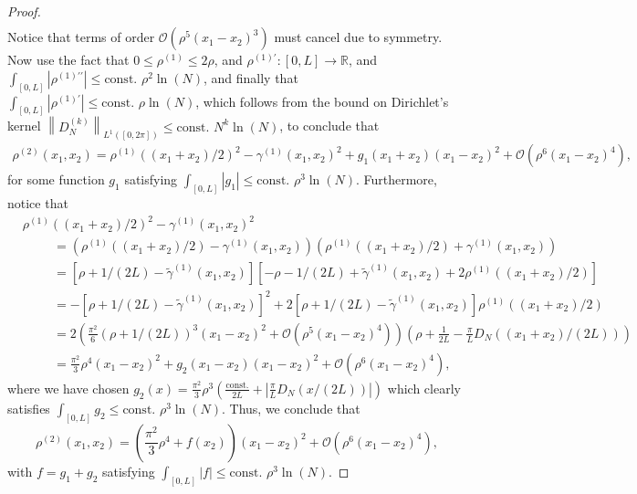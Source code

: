 \documentclass[a4paper,11pt]{article}
\newcommand{\norm}[1]{\left\lVert #1 \right\rVert}
\newcommand{\abs}[1]{\left\lvert #1 \right\rvert}
\newcommand{\R}{\mathbb{R}}
\numberwithin{equation}{section}
\begin{document}
\begin{proof}
\begin{equation}
\begin{aligned}
		\end{aligned}
		\end{equation}
		Notice that terms of order $ \mathcal{O}(\rho^5(x_1-x_2)^3) $ must cancel due to symmetry.\\
		Now use the fact that $ 0\leq\rho^{(1)}\leq 2\rho $, and $ \rho^{(1)\prime}:[0,L]\to \R $, and $\int_{[0,L]}\abs{\rho^{(1)\prime\prime}}\leq \text{const. }\rho^2\ln(N) $, and finally that  $\int_{[0,L]}\abs{\rho^{(1)\prime}}\leq \text{const. }\rho\ln(N) $, which follows from the bound on Dirichlet's kernel $ \norm{D_N^{(k)}}_{L^1([0,2\pi])}\leq \text{const. }N^{k}\ln(N) $, to conclude that
		\begin{equation}
		\begin{aligned}
		\rho^{(2)}(x_1,x_2)=\rho^{(1)}((x_1+x_2)/2)^2-\gamma^{(1)}(x_1,x_2)^2+g_1(x_1+x_2)(x_1-x_2)^2+\mathcal{O}(\rho^6(x_1-x_2)^4),
		\end{aligned}
		\end{equation}
		for some function $ g_1 $ satisfying $ \int_{[0,L]}\abs{g_1}\leq \text{const. }\rho^3\ln(N)$.
		Furthermore, notice that 
		\begin{equation}
		\begin{aligned}
		&\rho^{(1)}((x_1+x_2)/2)^2-\gamma^{(1)}(x_1,x_2)^2\\
		&\hspace{1cm}=(\rho^{(1)}((x_1+x_2)/2)-\gamma^{(1)}(x_1,x_2))(\rho^{(1)}((x_1+x_2)/2)+\gamma^{(1)}(x_1,x_2))\\&\hspace{1cm}
		=\left[\rho+1/(2L)-\tilde{\gamma}^{(1)}(x_1,x_2)\right]\left[-\rho-1/(2L)+\tilde{\gamma}^{(1)}(x_1,x_2)+2\rho^{(1)}((x_1+x_2)/2)\right]\\&\hspace{1cm}
		=-\left[\rho+1/(2L)-\tilde{\gamma}^{(1)}(x_1,x_2)\right]^2+2\left[\rho+1/(2L)-\tilde{\gamma}^{(1)}(x_1,x_2)\right]\rho^{(1)}((x_1+x_2)/2)\\&\hspace{1cm}
		= 2\left(\frac{\pi^2}{6}(\rho+1/(2L))^3(x_1-x_2)^2+\mathcal{O}(\rho^5(x_1-x_2)^4)\right)\left(\rho+\frac{1}{2L}-\frac{\pi}{L}D_{N}((x_1+x_2)/(2L))\right)\\&\hspace{1cm}
		=\frac{\pi^2}{3}\rho^4(x_1-x_2)^2+g_2(x_1-x_2)(x_1-x_2)^2+\mathcal{O}(\rho^6(x_1-x_2)^4),
		\end{aligned}
		\end{equation}
		where we have chosen $ g_2(x)=\frac{\pi^2}{3}\rho^3\left(\frac{\text{const.}}{2L}+\abs{\frac{\pi}{L}D_N(x/(2L))} \right) $ which clearly satisfies $  \int_{[0,L]} g_2\leq \text{const. } \rho^3 \ln(N) $.
		Thus, we conclude that \begin{equation}
		\rho^{(2)}(x_1,x_2)=\left(\frac{\pi^2}{3}\rho^4+f(x_2)\right)(x_1-x_2)^2+\mathcal{O}(\rho^6(x_1-x_2)^4), 
		\end{equation}
		with $ f=g_1+g_2 $ satisfying $ \int_{[0,L]} \abs{f}\leq \text{const. } \rho^3 \ln(N) $.
	\end{proof}
\end{document}
